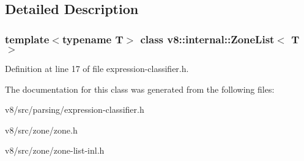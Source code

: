 \subsection{Detailed Description}
\subsubsection*{template$<$typename T$>$\newline
class v8\+::internal\+::\+Zone\+List$<$ T $>$}



Definition at line 17 of file expression-\/classifier.\+h.



The documentation for this class was generated from the following files\+:\begin{DoxyCompactItemize}
\item 
v8/src/parsing/expression-\/classifier.\+h\item 
v8/src/zone/zone.\+h\item 
v8/src/zone/zone-\/list-\/inl.\+h\end{DoxyCompactItemize}
